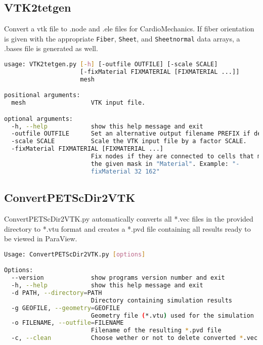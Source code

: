\subsection{VTK2tetgen}
\label{tools:VTK2tetgen}

Convert a vtk file to .node and .ele files for CardioMechanics.
If fiber orientation is given with the appropriate \verb|Fiber|, \verb|Sheet|, and \verb|Sheetnormal| data arrays, a .bases file is generated as well.

\begin{lstlisting}[language=bash,caption=Syntax for VTK2tetgen.py]
usage: VTK2tetgen.py [-h] [-outfile OUTFILE] [-scale SCALE]
                     [-fixMaterial FIXMATERIAL [FIXMATERIAL ...]]
                     mesh

positional arguments:
  mesh                  VTK input file.

optional arguments:
  -h, --help            show this help message and exit
  -outfile OUTFILE      Set an alternative output filename PREFIX if desired.
  -scale SCALE          Scale the VTK input file by a factor SCALE.
  -fixMaterial FIXMATERIAL [FIXMATERIAL ...]
                        Fix nodes if they are connected to cells that match 
                        the given mask in "Material". Example: "-
                        fixMaterial 32 162" 
\end{lstlisting}


\subsection{ConvertPETScDir2VTK}
\label{tools:ConvertPETScDir2VTK}

ConvertPETScDir2VTK.py automatically converts all *.vec files in the provided directory to *.vtu format and creates a *.pvd file containing all results ready to be viewed in ParaView.

\begin{lstlisting}[language=bash,caption=Syntax for ConvertPETScDir2VTK.py]
Usage: ConvertPETScDir2VTK.py [options]

Options:
  --version             show programs version number and exit
  -h, --help            show this help message and exit
  -d PATH, --directory=PATH
                        Directory containing simulation results
  -g GEOFILE, --geometry=GEOFILE
                        Geometry file (*.vtu) used for the simulation
  -o FILENAME, --outfile=FILENAME
                        Filename of the resulting *.pvd file
  -c, --clean           Choose wether or not to delete converted *.vec files
\end{lstlisting}



